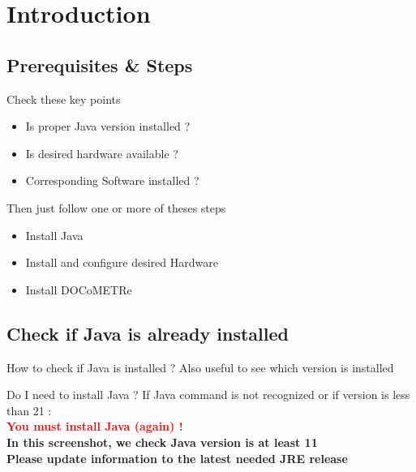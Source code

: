 \documentclass[a4paper,11pt]{beamer}
\begin{document}
\section{Introduction}
\subsection{Prerequisites \& Steps}
\begin{frame}
\begin{block}{Check these key points}
     \begin{itemize}
        \item Is proper Java version installed ?
        \item Is desired hardware available ?
        \item Corresponding Software installed ?
    \end{itemize}
\end{block}
\begin{block}{Then just follow one or more of theses steps}
\begin{itemize}
        \item Install Java
        \item Install and configure desired Hardware
        \item Install DOCoMETRe
    \end{itemize}
\end{block}
    
\end{frame}

\subsection{Check if Java is already installed}
\begin{frame}
\begin{exampleblock}{How to check if Java is installed ?}
    \centering
    Also useful to see which version is installed
\end{exampleblock}


\begin{alertblock}{Do I need to install Java ?}
    \centering
    If Java command is not recognized or if version is less than 21 :\\
    \textcolor{red}{\textbf{You must install Java (again) !}}\\
    \vspace{0.5cm}
    \textbf{In this screenshot, we check Java version is at least 11}\\
    \textbf{Please update information to the latest needed JRE release}
\end{alertblock}

\end{frame}
\end{document}
